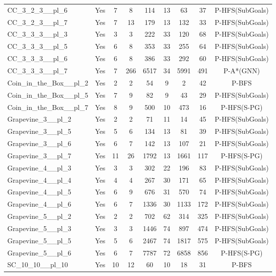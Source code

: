 \documentclass{article}
\begin{document}
\begin{tabular}{lcccccccc}
CC\_3\_2\_3\_\_pl\_6 & Yes & 7 & 8 & 114 & 13 & 63 & 37 & P-HFS(SubGoals) \\
CC\_3\_2\_3\_\_pl\_7 & Yes & 7 & 13 & 179 & 13 & 132 & 33 & P-HFS(SubGoals) \\
CC\_3\_3\_3\_\_pl\_3 & Yes & 3 & 3 & 222 & 33 & 120 & 68 & P-HFS(SubGoals) \\
CC\_3\_3\_3\_\_pl\_5 & Yes & 6 & 8 & 353 & 33 & 255 & 64 & P-HFS(SubGoals) \\
CC\_3\_3\_3\_\_pl\_6 & Yes & 6 & 8 & 386 & 33 & 292 & 60 & P-HFS(SubGoals) \\
CC\_3\_3\_3\_\_pl\_7 & Yes & 7 & 266 & 6517 & 34 & 5991 & 491 & P-A*(GNN) \\
Coin\_in\_the\_Box\_\_pl\_2 & Yes & 2 & 2 & 54 & 9 & 2 & 42 & P-BFS \\
Coin\_in\_the\_Box\_\_pl\_5 & Yes & 7 & 9 & 82 & 9 & 43 & 29 & P-HFS(SubGoals) \\
Coin\_in\_the\_Box\_\_pl\_7 & Yes & 8 & 9 & 500 & 10 & 473 & 16 & P-HFS(S-PG) \\
Grapevine\_3\_\_pl\_2 & Yes & 2 & 2 & 71 & 11 & 14 & 45 & P-HFS(SubGoals) \\
Grapevine\_3\_\_pl\_5 & Yes & 5 & 6 & 134 & 13 & 81 & 39 & P-HFS(SubGoals) \\
Grapevine\_3\_\_pl\_6 & Yes & 6 & 7 & 142 & 13 & 107 & 21 & P-HFS(SubGoals) \\
Grapevine\_3\_\_pl\_7 & Yes & 11 & 26 & 1792 & 13 & 1661 & 117 & P-HFS(S-PG) \\
Grapevine\_4\_\_pl\_3 & Yes & 3 & 3 & 302 & 22 & 196 & 83 & P-HFS(SubGoals) \\
Grapevine\_4\_\_pl\_4 & Yes & 4 & 4 & 267 & 30 & 171 & 65 & P-HFS(SubGoals) \\
Grapevine\_4\_\_pl\_5 & Yes & 6 & 9 & 676 & 31 & 570 & 74 & P-HFS(SubGoals) \\
Grapevine\_4\_\_pl\_6 & Yes & 6 & 7 & 1336 & 30 & 1133 & 172 & P-HFS(SubGoals) \\
Grapevine\_5\_\_pl\_2 & Yes & 2 & 2 & 702 & 62 & 314 & 325 & P-HFS(SubGoals) \\
Grapevine\_5\_\_pl\_3 & Yes & 3 & 3 & 1446 & 74 & 897 & 474 & P-HFS(SubGoals) \\
Grapevine\_5\_\_pl\_5 & Yes & 5 & 6 & 2467 & 74 & 1817 & 575 & P-HFS(SubGoals) \\
Grapevine\_5\_\_pl\_6 & Yes & 6 & 7 & 7787 & 72 & 6858 & 856 & P-HFS(S-PG) \\
SC\_10\_10\_\_pl\_10 & Yes & 10 & 12 & 60 & 10 & 18 & 31 & P-BFS \\

\end{tabular}
\end{document}
